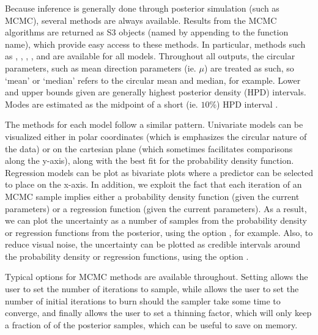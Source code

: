 Because inference is generally done through posterior simulation (such
as MCMC), several methods are always available. Results from the MCMC
algorithms are returned as S3 objects (named by appending  to
the function name), which provide easy access to these methods. In
particular, methods such as , ,
, ,  and 
are available for all models. Throughout all outputs, the circular
parameters, such as mean direction parameters (ie. \(\mu\)) are treated
as such, so `mean' or `median' refers to the circular mean and median,
for example. Lower and upper bounds given are generally highest
posterior density (HPD) intervals. Modes are estimated as the midpoint
of a short (ie. \(10\%\)) HPD interval \citep{venter1967estimation}.

The  methods for each model follow a similar pattern.
Univariate models can be visualized either in polar coordinates (which
is emphasizes the circular nature of the data) or on the cartesian plane
(which sometimes facilitates comparisons along the y-axis), along with
the best fit for the probability density function. Regression models can
be plot as bivariate plots where a predictor can be selected to place on
the x-axis. In addition, we exploit the fact that each iteration of an
MCMC sample implies either a probability density function (given the
current parameters) or a regression function (given the current
parameters). As a result, we can plot the uncertainty as a number of
samples from the probability density or regression functions from the
posterior, using the option , for example. Also,
to reduce visual noise, the uncertainty can be plotted as credible
intervals around the probability density or regression functions, using
the option .

Typical options for MCMC methods are available throughout. Setting
 allows the user to set the number of iterations to sample,
while  allows the user to set the number of initial
iterations to burn should the sampler take some time to converge, and
finally  allows the user to set a thinning factor, which will
only keep a fraction of  of the posterior samples, which
can be useful to save on memory.

